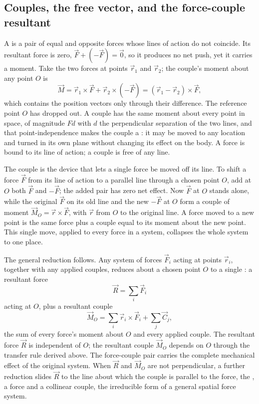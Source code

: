 \subsection{Couples, the free vector, and the force-couple resultant}

A  is a pair of equal and opposite forces whose lines of
action do not coincide. Its resultant force is zero, $\vec{F} +
(-\vec{F}) = \vec{0}$, so it produces no net push, yet it carries a moment.
Take the two forces at points $\vec{r}_1$ and $\vec{r}_2$; the couple's
moment about any point $O$ is
\[
\vec{M} = \vec{r}_1 \times \vec{F} + \vec{r}_2 \times (-\vec{F})
= (\vec{r}_1 - \vec{r}_2) \times \vec{F},
\]
which contains the position vectors only through their difference. The
reference point $O$ has dropped out. A couple has the same moment about
every point in space, of magnitude $Fd$ with $d$ the perpendicular
separation of the two lines, and that point-independence makes the couple
a : it may be moved to any location and turned in its
own plane without changing its effect on the body. A force is bound to its
line of action; a couple is free of any line.



The couple is the device that lets a single force be moved off its line.
To shift a force $\vec{F}$ from its line of action to a parallel line
through a chosen point $O$, add at $O$ both $\vec{F}$ and $-\vec{F}$; the
added pair has zero net effect. Now $\vec{F}$ at $O$ stands alone, while
the original $\vec{F}$ on its old line and the new $-\vec{F}$ at $O$ form a
couple of moment $\vec{M}_O = \vec{r} \times \vec{F}$, with $\vec{r}$ from
$O$ to the original line. A force moved to a new point is the same force
plus a couple equal to its moment about the new point. This single move,
applied to every force in a system, collapses the whole system to one place.

The general reduction follows. Any system of forces $\vec{F}_i$ acting at
points $\vec{r}_i$, together with any applied couples, reduces about a
chosen point $O$ to a single : a resultant
force
\[
\vec{R} = \sum_i \vec{F}_i
\]
acting at $O$, plus a resultant couple
\[
\vec{M}_O = \sum_i \vec{r}_i \times \vec{F}_i + \sum_j \vec{C}_j,
\]
the sum of every force's moment about $O$ and every applied couple. The
resultant force $\vec{R}$ is independent of $O$; the resultant couple
$\vec{M}_O$ depends on $O$ through the transfer rule derived above. The
force-couple pair carries the complete mechanical effect of the original
system. When $\vec{R}$ and $\vec{M}_O$ are not perpendicular, a further
reduction slides $\vec{R}$ to the line about which the couple is parallel
to the force, the , a force and a collinear couple, the
irreducible form of a general spatial force system.

